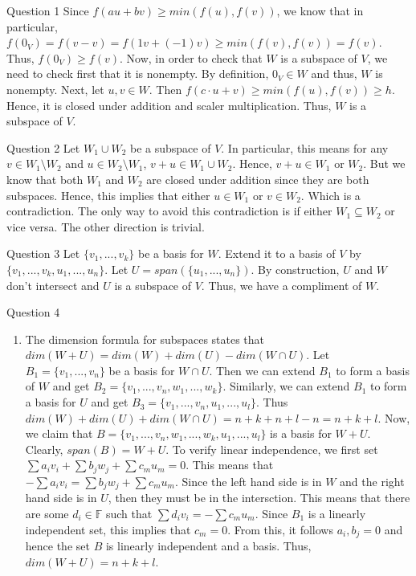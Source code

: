 \documentclass[12pt]{exam}
\begin{document}
\begin{questions}
\question Question 1\newline
Since $f(au+bv) \geq min(f(u), f(v))$, we know that in particular, $f(0_V) = f(v-v) = f(1v+(-1)v) \geq min(f(v), f(v)) = f(v)$. Thus, $f(0_V) \geq f(v)$. Now, in order to check that $W$ is a subspace of $V$, we need to check first that it is nonempty. By definition, $0_V \in W$ and thus, $W$ is nonempty. Next, let $u,v \in W$. Then $f(c\cdot u+v) \geq min(f(u), f(v)) \geq h$. Hence, it is closed under addition and scaler multiplication. Thus, $W$ is a subspace of $V$.

\question Question 2 \newline
Let $W_1 \cup W_2$ be a subspace of $V$. In particular, this means for any $v \in W_1 \setminus W_2$ and $u \in W_2 \setminus W_1$, $v + u \in W_1 \cup W_2$. Hence, $v + u \in W_1$ or $W_2$. But we know that both $W_1$ and $W_2$ are closed under addition since they are both subspaces. Hence, this implies that either $u \in W_1$ or $v\in W_2$. Which is a contradiction. The only way to avoid this contradiction is if either $W_1 \subseteq W_2$ or vice versa. The other direction is trivial. 

\question Question 3\newline
Let $\{v_1, ..., v_k\}$ be a basis for $W$. Extend it to a basis of $V$ by $\{v_1, ..., v_k, u_1, ..., u_n\}$. Let $U = span(\{u_1, ..., u_n\})$. By construction, $U$ and $W$ don't intersect and $U$ is a subspace of $V$. Thus, we have a compliment of $W$.

\question Question 4\newline 
\begin{enumerate}
    \item The dimension formula for subspaces states that $dim(W + U) = dim(W) + dim(U) - dim(W \cap U)$. Let $B_1 = \{v_1, ..., v_n\}$ be a basis for $W\cap U$. Then we can extend $B_1$ to form a basis of $W$ and get $B_2 = \{v_1, ..., v_n, w_1, ..., w_k\}$. Similarly, we can extend $B_1$ to form a basis for $U$ and get $B_3 = \{v_1, ..., v_n, u_1, ..., u_l\}$. Thus $dim(W) + dim(U) + dim(W \cap U) = n + k + n + l - n = n+k+l$. Now, we claim that $B = \{v_1, ..., v_n, w_1, ..., w_k, u_1, ..., u_l\}$ is a basis for $W+U$. Clearly, $span(B) = W+U$. To verify linear independence, we first set $\sum a_i v_i + \sum b_j w_j + \sum c_m u_m = 0$. This means that $-\sum a_i v_i = \sum b_j w_j + \sum c_m u_m$. Since the left hand side is in $W$ and the right hand side is in $U$, then they must  be in the intersction. This means that there are some $d_i \in \mathbb{F}$ such that $\sum d_i v_i = -\sum c_m u_m$. Since $B_1$ is a linearly independent set, this implies that $c_m = 0$. From this, it follows $a_i, b_j = 0$ and hence the set $B$ is linearly independent and a basis. Thus, $dim(W+U) = n+k+l$. 
    

\end{enumerate}
\end{questions}
\end{document}
